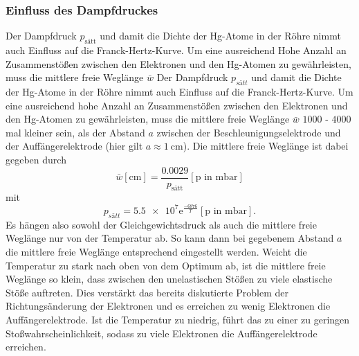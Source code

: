 \subsubsection*{Einfluss des Dampfdruckes}
Der Dampfdruck $p_\text{sätt}$ und damit die Dichte der Hg-Atome in der Röhre nimmt auch Einfluss auf die Franck-Hertz-Kurve. Um eine ausreichend
Hohe Anzahl an Zusammenstößen zwischen den Elektronen und den Hg-Atomen zu gewährleisten, muss die mittlere freie Weglänge $\bar{w}$
Der Dampfdruck $p_{sätt}$ und damit die Dichte der Hg-Atome in der Röhre nimmt auch Einfluss auf die Franck-Hertz-Kurve. Um eine ausreichend
hohe Anzahl an Zusammenstößen zwischen den Elektronen und den Hg-Atomen zu gewährleisten, muss die mittlere freie Weglänge $\bar{w}$
$\num{1000}$ - $\num{4000}$ mal kleiner sein, als der Abstand $a$ zwischen der Beschleunigungselektrode und der Auffängerelektrode (hier gilt
$a\approx\SI{1}{\centi\metre}$). Die mittlere freie Weglänge ist dabei gegeben durch
\begin{equation}
    \bar{w}[\si{\centi\metre}]=\frac{\num{0.0029}}{p_\text{sätt}} [\text{p in } \si{\milli\bar}]
    \label{eqn:freieweglaengetheorie}
\end{equation}
mit
\begin{equation}
    p_{sätt}=\num{5.5e7}\text{e}^{\frac{-6876}{T}} [\text{p in }\si{\milli\bar}] .
    \label{eqn:sättigungsdampfdrtheorie}
\end{equation}
Es hängen also sowohl der Gleichgewichtsdruck als auch die mittlere freie Weglänge nur von der Temperatur ab. So kann dann bei gegebenem
Abstand $a$ die mittlere freie Weglänge entsprechend eingestellt werden. Weicht die Temperatur zu stark nach oben von dem Optimum ab, ist die
mittlere freie Weglänge so klein, dass zwischen den unelastischen Stößen zu viele elastische Stöße auftreten. Dies verstärkt das bereits
diskutierte Problem der Richtungsänderung der Elektronen und es erreichen zu wenig Elektronen die Auffängerelektrode. Ist die Temperatur zu
niedrig, führt das zu einer zu geringen Stoßwahrscheinlichkeit, sodass zu viele Elektronen die Auffängerelektrode erreichen.
